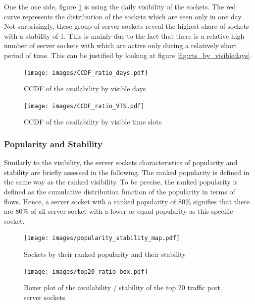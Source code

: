 One the one side, figure \ref{fig:ccdf_ratio_days} is using the daily visibility 
of the sockets. The red curve represents the distribution of the sockets which 
are seen only in one day. Not surprisingly, these group of server sockets reveal 
the highest share of sockets with a stability of 1. This is mainly due to the 
fact that there is a relative high number of server sockets with which are 
active only during a relatively short period of time. This can be justified by 
looking at figure \ref{fig:vts_by_visibledays}.

\begin{landscape}
\begin{figure}
	[p] \centering 
	\texttt{[image: images/CCDF\_ratio\_days.pdf]}
	\caption{CCDF of the availability by visible days} 
	\label{fig:ccdf_ratio_days} 
\end{figure}
\end{landscape}

\begin{landscape}
\begin{figure}
	[p] \centering 
	\texttt{[image: images/CCDF\_ratio\_VTS.pdf]}
	\caption{CCDF of the availability by visible time slots} 
	\label{fig:ccdf_ratio_vts} 
\end{figure}
\end{landscape}

\subsubsection{Popularity and Stability}
Similarly to the visibility, the server sockets characteristics of popularity 
and stability are briefly assessed in the following. The ranked popularity is 
defined in the same way as the ranked visibility. To be precise, the ranked 
popularity is defined as the cumulative distribution function of the popularity 
in terms of flows. Hence, a server socket with a ranked popularity of 80\% 
signifies that there are 80\% of all server socket with a lower or equal 
popularity as this specific socket.


\begin{figure}
	[ht] \centering 
	\texttt{[image: images/popularity\_stability\_map.pdf]}
	\caption{Sockets by their ranked popularity and their stability} 
	\label{fig:rankedPopularity} 
\end{figure}


\begin{landscape}
	\begin{figure}
	[p] \centering 
	\texttt{[image: images/top20\_ratio\_box.pdf]}
	\caption{Boxer plot of the availability / stability of the top 20 traffic port server sockets} 
	\label{fig:top20_ratio_box} 
\end{figure}
\end{landscape}

